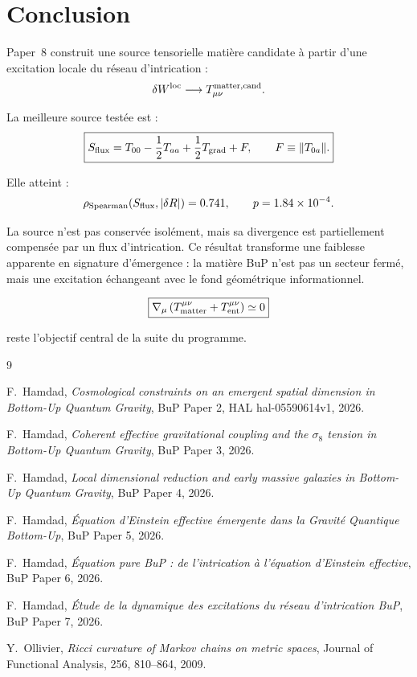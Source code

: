 \documentclass[11pt,a4paper]{article}
\begin{document}
\section{Conclusion}

Paper~8 construit une source tensorielle matière candidate à partir d'une
excitation locale du réseau d'intrication :
\[
\delta W^{\rm loc}
\longrightarrow
T_{\mu\nu}^{\rm matter,cand}.
\]

La meilleure source testée est :
\[
\boxed{
S_{\rm flux}
=
T_{00}
-\frac12 T_{aa}
+
\frac12 T_{\rm grad}
+
F,
\qquad
F\equiv\|T_{0a}\|.
}
\]

Elle atteint :
\[
\rho_{\rm Spearman}(S_{\rm flux}, |\delta R|)
=
0.741,
\qquad
p = 1.84 \times 10^{-4}.
\]

La source n'est pas conservée isolément, mais sa divergence est partiellement
compensée par un flux d'intrication. Ce résultat transforme une faiblesse
apparente en signature d'émergence : la matière BuP n'est pas un secteur fermé,
mais une excitation échangeant avec le fond géométrique informationnel.

\[
\boxed{
\nabla_\mu
\left(
T_{\rm matter}^{\mu\nu}
+
T_{\rm ent}^{\mu\nu}
\right)
\simeq 0
}
\]

reste l'objectif central de la suite du programme.

\begin{thebibliography}{9}

F.~Hamdad,
\textit{Cosmological constraints on an emergent spatial dimension in Bottom-Up Quantum Gravity},
BuP Paper 2, HAL hal-05590614v1, 2026.

F.~Hamdad,
\textit{Coherent effective gravitational coupling and the \(\sigma_8\) tension in Bottom-Up Quantum Gravity},
BuP Paper 3, 2026.

F.~Hamdad,
\textit{Local dimensional reduction and early massive galaxies in Bottom-Up Quantum Gravity},
BuP Paper 4, 2026.

F.~Hamdad,
\textit{Équation d'Einstein effective émergente dans la Gravité Quantique Bottom-Up},
BuP Paper 5, 2026.

F.~Hamdad,
\textit{Équation pure BuP : de l'intrication à l'équation d'Einstein effective},
BuP Paper 6, 2026.

F.~Hamdad,
\textit{Étude de la dynamique des excitations du réseau d'intrication BuP},
BuP Paper 7, 2026.

Y.~Ollivier,
\textit{Ricci curvature of Markov chains on metric spaces},
Journal of Functional Analysis, 256, 810--864, 2009.

\end{thebibliography}
\end{document}

